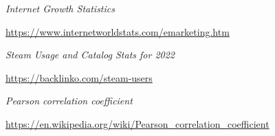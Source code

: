 \documentclass[12pt,a4paper]{report}
\begin{document}
\begin{thebibliography}{9}
  
  \textit{Internet Growth Statistics}
  
  \url{https://www.internetworldstats.com/emarketing.htm}
  
  
  \textit{Steam Usage and Catalog Stats for 2022}
  
  \url{https://backlinko.com/steam-users}
  
  
  \textit{Pearson correlation coefficient}
  
  \url{https://en.wikipedia.org/wiki/Pearson_correlation_coefficient}


\end{thebibliography}
\end{document}
